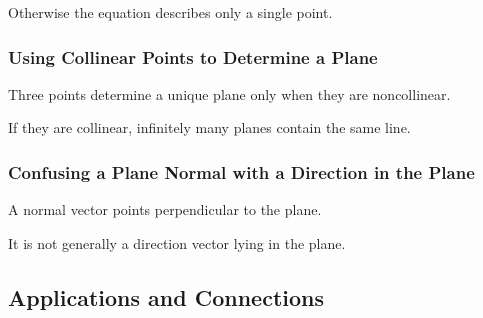 Otherwise the equation describes only a single point.

\subsubsection{Using Collinear Points to Determine a Plane}

Three points determine a unique plane only when they are noncollinear.

If they are collinear, infinitely many planes contain the same line.

\subsubsection{Confusing a Plane Normal with a Direction in the Plane}

A normal vector points perpendicular to the plane.

It is not generally a direction vector lying in the plane.

\subsection{Applications and Connections}
\label{subsec:vector-geometry-applications}

